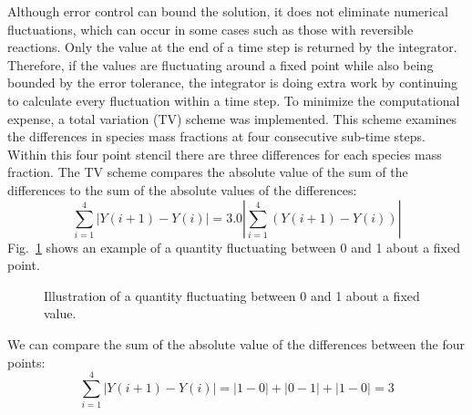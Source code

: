 Although error control can bound the solution, it does not eliminate numerical fluctuations, which can occur in some cases such as those with reversible reactions. Only the value at the end of a time step is returned by the integrator. Therefore, if the values are fluctuating around a fixed point while also being bounded by the error tolerance, the integrator is doing extra work by continuing to calculate every fluctuation within a time step. To minimize the computational expense, a total variation (TV) scheme was implemented. This scheme examines the differences in species mass fractions at four consecutive sub-time steps. Within this four point stencil there are three differences for each species mass fraction. The TV scheme compares the absolute value of the sum of the differences to the sum of the absolute values of the differences:
\begin{equation}\label{eq:TV}
\displaystyle \sum_{i=1}^{4}|Y(i+1)-Y(i)| = 3.0|\displaystyle \sum_{i=1}^{4}(Y(i+1)-Y(i))|
\end{equation}
Fig.~\ref{fig:TV} shows an example of a quantity fluctuating between 0 and 1 about a fixed point.
\begin{figure}[h!]
\begin{center}
\caption{\label{fig:TV} Illustration of a quantity fluctuating between 0 and 1 about a fixed value.}
\end{center}
\end{figure}
We can compare the sum of the absolute value of the differences between the four points:
\begin{equation}\label{eq:sum_abs_tv}
\displaystyle \sum_{i=1}^{4}|Y(i+1)-Y(i)| = |1-0| + |0-1| + |1-0| = 3
\end{equation}
